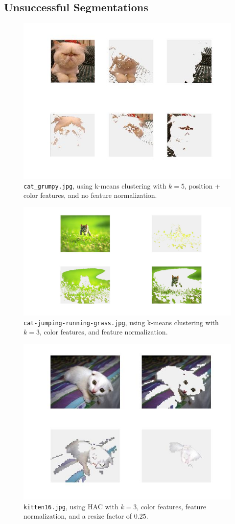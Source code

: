 \documentclass[12pt]{article}
\begin{document}
\subsection{Unsuccessful Segmentations}
\begin{figure}[H]
	\centering
	\includegraphics[width=.7\textwidth]{unsucc1.jpg}
	\caption{\texttt{cat\_grumpy.jpg}, using k-means clustering with $k = 5$, position + color features, and no feature normalization.}
\end{figure}

\begin{figure}[H]
	\centering
	\includegraphics[width=.7\textwidth]{unsucc2.jpg}
	\caption{\texttt{cat-jumping-running-grass.jpg}, using k-means clustering with $k = 3$, color features, and feature normalization.}
\end{figure}

\begin{figure}[H]
	\centering
	\includegraphics[width=.75\textwidth]{unsucc3.jpg}
	\caption{\texttt{kitten16.jpg}, using HAC with $k = 3$, color features, feature normalization, and a resize factor of $0.25$.}
\end{figure}
\end{document}
